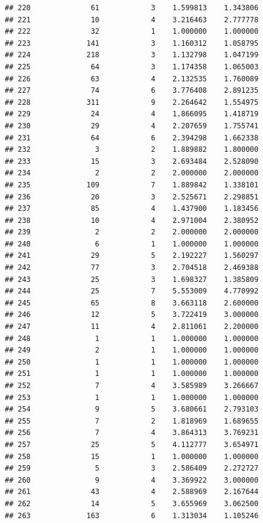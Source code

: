 \documentclass[
]{article}
\begin{document}
\begin{verbatim}
## 220              61            3    1.599813    1.343806
## 221              10            4    3.216463    2.777778
## 222              32            1    1.000000    1.000000
## 223             141            3    1.160312    1.058795
## 224             218            3    1.132798    1.047199
## 225              64            3    1.174358    1.065003
## 226              63            4    2.132535    1.760089
## 227              74            6    3.776408    2.891235
## 228             311            9    2.264642    1.554975
## 229              24            4    1.866095    1.418719
## 230              29            4    2.207659    1.755741
## 231              64            6    2.394298    1.662338
## 232               3            2    1.889882    1.800000
## 233              15            3    2.693484    2.528090
## 234               2            2    2.000000    2.000000
## 235             109            7    1.889842    1.338101
## 236              20            3    2.525671    2.298851
## 237              85            4    1.437900    1.183456
## 238              10            4    2.971004    2.380952
## 239               2            2    2.000000    2.000000
## 240               6            1    1.000000    1.000000
## 241              29            5    2.192227    1.560297
## 242              77            3    2.704518    2.469388
## 243              25            3    1.698327    1.385809
## 244              25            7    5.553009    4.770992
## 245              65            8    3.663118    2.600000
## 246              12            5    3.722419    3.000000
## 247              11            4    2.811061    2.200000
## 248               1            1    1.000000    1.000000
## 249               2            1    1.000000    1.000000
## 250               1            1    1.000000    1.000000
## 251               1            1    1.000000    1.000000
## 252               7            4    3.585989    3.266667
## 253               1            1    1.000000    1.000000
## 254               9            5    3.680661    2.793103
## 255               7            2    1.818969    1.689655
## 256               7            4    3.864313    3.769231
## 257              25            5    4.112777    3.654971
## 258              15            1    1.000000    1.000000
## 259               5            3    2.586409    2.272727
## 260               9            4    3.369922    3.000000
## 261              43            4    2.588969    2.167644
## 262              14            5    3.655969    3.062500
## 263             163            6    1.313034    1.105246

\end{verbatim}
\end{document}
